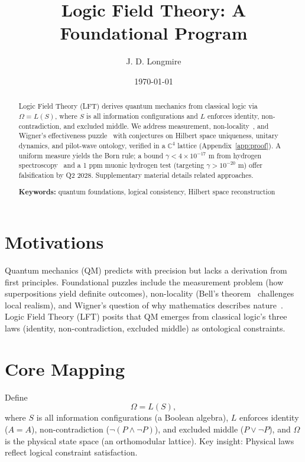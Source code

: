 \documentclass[aps,prx,twocolumn]{revtex4-2}
\begin{document}
\title{Logic Field Theory: A Foundational Program}
\author{J. D. Longmire}
\date{\today}

\begin{abstract}
Logic Field Theory (LFT) derives quantum mechanics from classical logic via $\Omega = L(S)$, where $S$ is all information configurations and $L$ enforces identity, non-contradiction, and excluded middle. We address measurement, non-locality~\cite{bell1964}, and Wigner’s effectiveness puzzle~\cite{wigner1960} with conjectures on Hilbert space uniqueness, unitary dynamics, and pilot-wave ontology, verified in a $\mathbb{C}^4$ lattice (Appendix~\ref{app:proof}). A uniform measure yields the Born rule; a bound $\gamma < 4 \times 10^{-17}$ m from hydrogen spectroscopy~\cite{parthey2011} and a 1 ppm muonic hydrogen test (targeting $\gamma > 10^{-20}$ m) offer falsification by Q2 2028. Supplementary material details related approaches.

\textbf{Keywords:} quantum foundations, logical consistency, Hilbert space reconstruction
\end{abstract}

\maketitle

\section{Motivations}
Quantum mechanics (QM) predicts with precision but lacks a derivation from first principles. Foundational puzzles include the measurement problem (how superpositions yield definite outcomes), non-locality (Bell’s theorem~\cite{bell1964} challenges local realism), and Wigner’s question of why mathematics describes nature~\cite{wigner1960}. Logic Field Theory (LFT) posits that QM emerges from classical logic’s three laws (identity, non-contradiction, excluded middle) as ontological constraints.

\section{Core Mapping}
\label{sec:core}
Define
\begin{equation}
\Omega = L(S),
\end{equation}
where $S$ is all information configurations (a Boolean algebra), $L$ enforces identity ($A=A$), non-contradiction ($\neg(P \land \neg P)$), and excluded middle ($P \lor \neg P$), and $\Omega$ is the physical state space (an orthomodular lattice). Key insight: Physical laws reflect logical constraint satisfaction.
\end{document}
